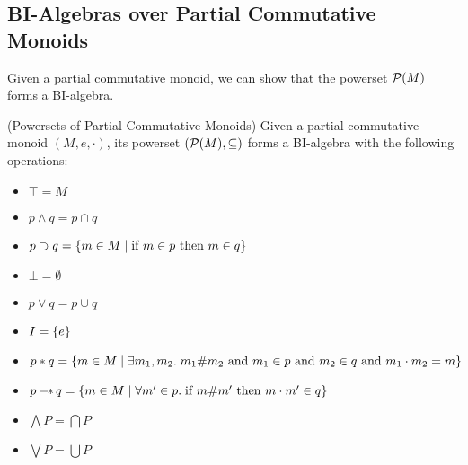 \subsection{BI-Algebras over Partial Commutative Monoids}

Given a partial commutative monoid, we can show that the powerset $\mathcal{P}(M)$ 
forms a BI-algebra. 

\begin{lemma}{(Powersets of Partial Commutative Monoids)}
Given a partial commutative monoid $(M, e, \cdot)$, its powerset
$(\mathcal{P}(M), \subseteq)$ forms a BI-algebra
with the following operations:

\begin{itemize}
\item $\top = M$
\item $p \land q = p \cap q$
\item $p \supset q = \{{m \in M \;|\;\mbox{if }m \in p \mbox{ then } m \in q}\}$
\item $\bot = \emptyset$ 
\item $p \vee q = p \cup q$
\item $I = \{{e}\}$
\item $p * q = \{{m \in M\;|\; \exists m_1, m_2.\; 
                       m_1 \# m_2 \mbox{ and } m_1 \in p \mbox{ and } m_2 \in q \mbox{ and } m_1\cdot m_2 = m}\}$
\item $p -\!\!*\, q = \{ m \in M \;|\; \forall m' \in p.\; \mbox{if } m \# m' \mbox{ then } m \cdot m' \in q \}$
\item $\bigwedge P = \bigcap P$ 
\item $\bigvee P = \bigcup P$
\end{itemize}
\end{lemma}


